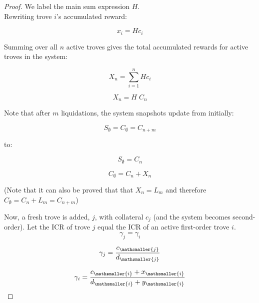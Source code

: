 \documentclass[reqno]{article}
\begin{document}
\begin{proof}
We label the main sum expression $H$.\\

Rewriting trove $i$’s accumulated reward:

\begin{equation} \label{eq:45}
    x_i=Hc_i
\end{equation}

\bigskip
Summing over all $n$ active troves gives the total accumulated rewards for active troves in the system:

\begin{equation} 
    X_n=\sum\limits^n_{i=1}Hc_i
\end{equation}

\begin{equation} \label{eq:47}
    X_n=H \; C_n
\end{equation}

\bigskip
Note that after $m$ liquidations, the system snapshots update from initially:

\begin{equation}
    S_\emptyset = C_\emptyset = C_{n+m}
\end{equation}

to:

\begin{equation} \label{eq:8}
    S_\emptyset=C_n
\end{equation}

\begin{equation} \label{eq:9}
    C_\emptyset=C_n+X_n
\end{equation}

\bigskip
(Note that it can also be proved that that $X_n=L_m$ and therefore $C_\emptyset=C_n+L_m=C_{n+m}$)

\bigskip
Now, a fresh trove is added, $j$, with collateral $c_j$ (and the system becomes second-order). Let the ICR of trove $j$ equal the ICR of an active first-order trove $i$.\\

\begin{equation} \label{eq:10}
    \gamma_j=\gamma_i
\end{equation}

\begin{equation} 
    \gamma_j=\frac{c_\mathsmaller{j}}{d_\mathsmaller{j}}
\end{equation}

\begin{equation} 
    \gamma_i=\frac{c_\mathsmaller{i}+x_\mathsmaller{i}}{d_\mathsmaller{i}+y_\mathsmaller{i}}
\end{equation}


\end{proof}
\end{document}
